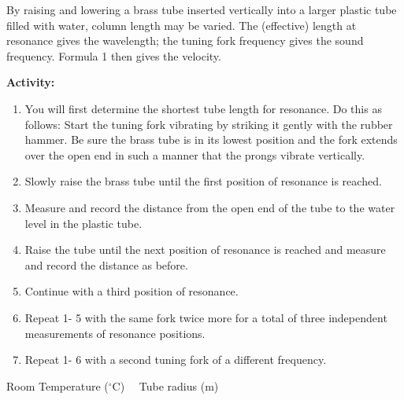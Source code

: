 
\noindent By raising and lowering a brass tube inserted vertically into a larger plastic tube filled with water, column length may be varied. The (effective) length at resonance gives the wavelength; the tuning fork frequency gives the sound frequency. Formula 1 then gives the velocity. 

\bigskip
{\noindent \bf Activity:} \begin{enumerate}

\item You will first determine the shortest tube length for resonance. Do this as follows: Start the tuning fork vibrating by striking it gently with the rubber hammer. Be sure the brass tube is in its lowest position and the fork extends over the open end in such a manner that the prongs vibrate vertically.

\item Slowly raise the brass tube until the first position of resonance is reached.

\item Measure and record the distance from the open end of the tube to the water level in the plastic tube.

\item Raise the tube until the next position of resonance is reached and measure and record the distance as before.

\item Continue with a third position of resonance.

\item Repeat 1- 5 with the same fork twice more for a total of three independent measurements of resonance positions.

\item Repeat 1- 6 with a second tuning fork of a different frequency.

\end{enumerate}

\vskip35pt


\medskip
\noindent Room Temperature ($^\circ$C) \hrulefill \ \  Tube radius (m) \hrulefill

